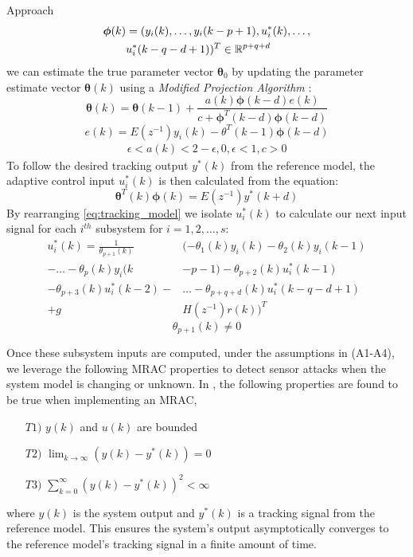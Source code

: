 \begin{section}{Approach}
	\begin{align}
	\begin{split}
	\bm{\phi}(k)&=(y_i(k), \dots ,y_i(k-p+1),u^*_i(k), \dots , \\
	& u^*_i(k-q-d+1))^T \in \mathbb{R}^{p+q+d}
	\end{split}
	\end{align}
we can estimate the true parameter vector $\bm{\theta}_0$ by updating the parameter estimate vector $\bm{\theta}(k)$ using a \textit{Modified Projection Algorithm} \cite{tao2003adaptive}:
	\begin{equation}
	\label{eq:Modified_Proj_Algorithm}
	\bm{\theta}(k)=\bm{\theta}(k-1)+\frac{a(k)\bm{\phi}(k-d)e(k)}{c+\bm{\phi}^T(k-d)\bm{\phi}(k-d)}
	\end{equation}
	\begin{equation}
	e(k)=E(z^{-1})y_i(k)-\theta^T(k-1)\bm{\phi}(k-d)
	\end{equation}
	\begin{align*}
	\epsilon<a(k)<2-\epsilon, 0,\epsilon<1, c>0
	\end{align*}
To follow the desired tracking output $y^*(k)$ from the reference model, the adaptive control input $u^*_i(k)$ is then calculated from the equation:
    \begin{equation}
    \label{eq:tracking_model}
	\bm{\theta}^T(k)\bm{\phi}(k)=E(z^{-1})y^*(k+d)
	\end{equation}
By rearranging \eqref{eq:tracking_model} we isolate $u^*_i(k)$ to calculate our next input signal for each $i^{th}$ subsystem for $i=1,2,\dots,s$:
	\begin{align}
	\label{eq:End}
	u^*_i(k)=\frac{1}{\theta_{p+1}(k)}&(-\theta_1(k)y_i(k)-\theta_2(k)y_i(k-1)  \nonumber \\
    -\dots-\theta_p(k)y_i(k&-p-1)-\theta_{p+2}(k)u^*_i(k-1)  \\
	-\theta_{p+3}(k)u^*_i(k-2)-& \dots - \theta_{p+q+d}(k)u^*_i(k-q-d+1) \nonumber \\
	+g&H(z^{-1})r(k))^T \nonumber
	\end{align}
    \begin{equation}
	\theta_{p+1}(k)\neq0 \nonumber
	\end{equation}

Once these subsystem inputs are computed, under the assumptions in (A1-A4), we leverage the following MRAC properties to detect sensor attacks when the system model is changing or unknown. In \cite{tao2003adaptive}, the following properties are found to be true when implementing an MRAC,
	\begin{enumerate}[label=(\roman*),leftmargin=4\parindent]
	\label{assumtions_ensure}
	\item[$T1)$] $y(k)$ and $u(k)$ are bounded 
	\item[$T2)$] $\lim_{k\to\infty}(y(k)-y^*(k))=0$
	\label{Truth2}
	\item[$T3)$] $\sum_{k=0}^\infty(y(k)-y^*(k))^2<\infty$
	\end{enumerate}
where $y(k)$ is the system output and $y^*(k)$ is a tracking signal from the reference model. This ensures the system's output asymptotically converges to the reference model's tracking signal in a finite amount of time. 



\end{section}
